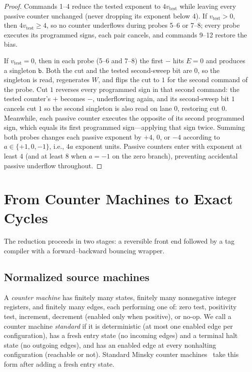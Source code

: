 \documentclass{article}
\theoremstyle{definition}
\theoremstyle{remark}
\newcommand{\ttw}[1]{\texttt{#1}}
\begin{document}
\begin{proof}
Commands 1--4 reduce the tested exponent to $4v_{\mathrm{test}}$ while leaving every passive counter unchanged (never dropping its exponent below $4$).
If $v_{\mathrm{test}} > 0$, then $4v_{\mathrm{test}} \ge 4$, so no counter underflows during probes 5--6 or 7--8; every probe executes its programmed signs, each pair cancels, and commands 9--12 restore the bias.

If $v_{\mathrm{test}} = 0$, then in each probe (5--6 and 7--8) the first $-$ hits $E=0$ and produces a singleton $\ttw{b}$.
Both the cut and the tested second-sweep bit are $0$, so the singleton is read, regenerates $W$, and flips the cut to $1$ for the second command of the probe.
Cut $1$ reverses every programmed sign in that second command: the tested counter's $+$ becomes $-$, underflowing again, and its second-sweep bit $1$ cancels cut $1$ so the second singleton is also read on lane $0$, restoring cut $0$.
Meanwhile, each passive counter executes the opposite of its second programmed sign, which equals its first programmed sign---applying that sign twice.
Summing both probes changes each passive exponent by $+4$, $0$, or $-4$ according to $a \in \{+1, 0, -1\}$, i.e., $4a$ exponent units.
Passive counters enter with exponent at least $4$ (and at least $8$ when $a=-1$ on the zero branch), preventing accidental passive underflow throughout.
\end{proof}

\section{From Counter Machines to Exact Cycles}

The reduction proceeds in two stages: a reversible front end followed by a tag compiler with a forward--backward bouncing wrapper.

\subsection{Normalized source machines}

A \emph{counter machine} has finitely many states, finitely many nonnegative integer registers, and finitely many edges, each performing one of: zero test, positivity test, increment, decrement (enabled only when positive), or no-op.
We call a counter machine \emph{standard} if it is deterministic (at most one enabled edge per configuration), has a fresh entry state (no incoming edges) and a terminal halt state (no outgoing edges), and has an enabled edge at every nonhalting configuration (reachable or not).
Standard Minsky counter machines~\cite{Minsky1967} take this form after adding a fresh entry state.
\end{document}
